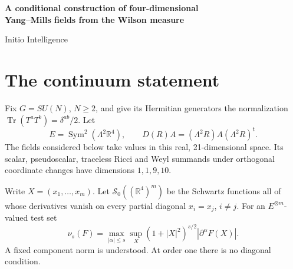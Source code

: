 \documentclass[11pt,letterpaper]{article}
\begin{document}
\thispagestyle{plain}
\begin{center}
{\LARGE\bfseries A conditional construction of four-dimensional\\[3pt] Yang--Mills fields from the Wilson measure\par}
\vspace{10pt}
{\large Initio Intelligence\par}
\end{center}
\vspace{2pt}
\begin{abstract}
We formulate a conditional existence theorem for the gauge-invariant curvature bilinears of four-dimensional \(SU(N)\) Wilson lattice theory. The lattice fields have 21 components and share one physical normalization. Exact conditional transport of their sources gives a representation of their joint moments. Uniform bounds on these moments and on the rotation defects would yield a common Euclidean limit. Ultraviolet and energy estimates would identify a vacuum phase of the reconstructed fields. The unresolved analytic and representation hypotheses are stated explicitly below.
\end{abstract}

\section{The continuum statement}

Fix \(G=SU(N)\), \(N\ge2\), and give its Hermitian generators the normalization
\(\operatorname{Tr}(T^aT^b)=\delta^{ab}/2\). Let
\[
 E=\operatorname{Sym}^2(\Lambda^2\mathbb R^4),\qquad
 D(R)A=(\Lambda^2 R)A(\Lambda^2 R)^t .
\]
The fields considered below take values in this real, 21-dimensional space.
Its scalar, pseudoscalar, traceless Ricci and Weyl summands under orthogonal
coordinate changes have dimensions \(1,1,9,10\).

Write \(X=(x_1,\ldots,x_m)\).
Let \(\mathcal S_0((\mathbb R^4)^m)\) be the Schwartz functions all of whose
derivatives vanish on every partial diagonal \(x_i=x_j\), \(i\ne j\). For
an \(E^{\otimes m}\)-valued test set
\[
 \nu_s(F)=\max_{|\alpha|\le s}\sup_X
 (1+|X|^2)^{s/2}|\partial^\alpha F(X)| .
\]
A fixed component norm is understood. At order one there is no diagonal condition.
\end{document}
